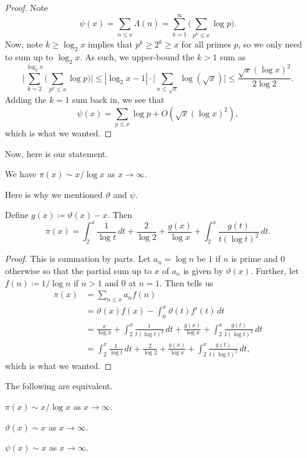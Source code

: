 \documentclass[../notes.tex]{subfiles}
\begin{document}
\begin{proof}
	Note
	\[\psi(x)=\sum_{n\le x}\Lambda(n)=\sum_{k=1}^\infty\Bigg(\sum_{p^k\le x}\log p\Bigg).\]
	Now, note $k\ge\log_2x$ implies that $p^k\ge2^k\ge x$ for all primes $p$, so we only need to sum up to $\log_2x$. As such, we upper-bound the $k>1$ sum as
	\[\Bigg|\sum_{k=2}^{\log_2x}\Bigg(\sum_{p^k\le x}\log p\Bigg)\Bigg|\le|\log_2x-1|\cdot\Bigg|\sum_{n\le\sqrt x}\log(\sqrt x)\Bigg|\le\frac{\sqrt x(\log x)^2}{2\log2}.\]
	Adding the $k=1$ sum back in, we see that
	\[\psi(x)=\sum_{p\le x}\log p+O\left(\sqrt x(\log x)^2\right),\]
	which is what we wanted.
\end{proof}
Now, here is our statement.
\begin{theorem}
	We have $\pi(x)\sim x/\log x$ as $x\to\infty$.
\end{theorem}
Here is why we mentioned $\vartheta$ and $\psi$.
\begin{lemma} \label{lem:get-pi-error}
	Define $g(x)\coloneqq\vartheta(x)-x$. Then
	\[\pi(x)=\int_2^x\frac1{\log t}\,dt+\frac2{\log2}+\frac{g(x)}{\log x}+\int_2^x\frac{g(t)}{t(\log t)^2}\,dt.\]
\end{lemma}
\begin{proof}
	This is summation by parts. Let $a_n=\log n$ be $1$ if $n$ is prime and $0$ otherwise so that the partial sum up to $x$ of $a_n$ is given by $\vartheta(x)$. Further, let $f(n)\coloneqq1/\log n$ if $n>1$ and $0$ at $n=1$. Then  tells us
	\begin{align*}
		\pi(x) &= \sum_{n\le x}a_nf(n) \\
		&= \vartheta(x)f(x)-\int_0^x\vartheta(t)f'(t)\,dt \\
		&= \frac{x}{\log x}+\int_2^x\frac{t}{t(\log t)^2}\,dt+\frac{g(x)}{\log x}+\int_2^x\frac{g(t)}{t(\log t)^2}\,dt \\
		&= \int_2^x\frac1{\log t}\,dt+\frac2{\log2}+\frac{g(x)}{\log x}+\int_2^x\frac{g(t)}{t(\log t)^2}\,dt,
	\end{align*}
	which is what we wanted.
\end{proof}
\begin{proposition}
	The following are equivalent.
	\begin{listalph}
		\item $\pi(x)\sim x/\log x$ as $x\to\infty$.
		\item $\vartheta(x)\sim x$ as $x\to\infty$.
		\item $\psi(x)\sim x$ as $x\to\infty$.
	\end{listalph}
\end{proposition}
\end{document}
